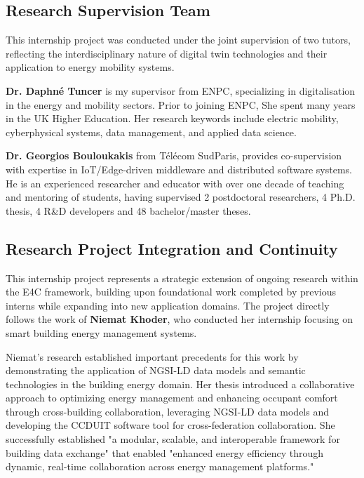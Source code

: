 \subsection{Research Supervision Team}

This internship project was conducted under the joint supervision of two tutors, 
reflecting the interdisciplinary nature of digital twin technologies and their 
application to energy mobility systems.

\textbf{Dr. Daphné Tuncer} is my supervisor from ENPC, specializing in 
digitalisation in the energy and mobility sectors.  Prior to joining ENPC, She spent many years in the UK Higher Education. Her research keywords include electric mobility, cyberphysical systems, data management, and applied data science.

\textbf{Dr. Georgios Bouloukakis} from Télécom SudParis, provides co-supervision with expertise in IoT/Edge-driven middleware and distributed software 
systems. He is an experienced researcher and educator with over one decade of teaching and mentoring of students, having supervised 2 postdoctoral researchers, 4 Ph.D. thesis, 4 R\&D developers and 48 bachelor/master theses. 

\subsection{Research Project Integration and Continuity}

This internship project represents a strategic extension of ongoing research within 
the E4C framework, building upon foundational work completed by previous interns 
while expanding into new application domains. The project directly follows the work 
of \textbf{Niemat Khoder}, who conducted her internship focusing on smart building energy 
management systems.

Niemat's research established important precedents for this work by demonstrating 
the application of NGSI-LD data models and semantic technologies in the building 
energy domain. Her thesis introduced a collaborative approach to optimizing energy 
management and enhancing occupant comfort through cross-building collaboration, 
leveraging NGSI-LD data models and developing the CCDUIT software tool for 
cross-federation collaboration. She successfully established "a modular, scalable, 
and interoperable framework for building data exchange" that enabled "enhanced 
energy efficiency through dynamic, real-time collaboration across energy management 
platforms."

